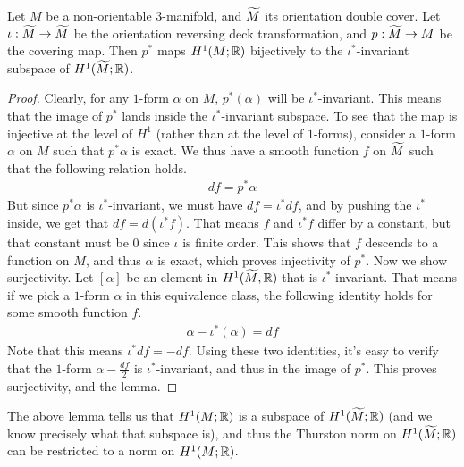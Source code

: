 \begin{lem}
  \label{lem:injective}
  Let $M$ be a non-orientable $3$-manifold, and $\widetilde{M}$ its orientation double cover. Let
  $\iota: \widetilde{M} \to \widetilde{M}$ be the orientation reversing deck transformation, and
  $p: \widetilde{M} \to M$ be the covering map. Then $p^{\ast}$ maps $H^1(M; \mathbb{R})$ bijectively to the
  $\iota^{\ast}$-invariant subspace of $H^1(\widetilde{M}; \mathbb{R})$.
\end{lem}
\begin{proof}
  Clearly, for any $1$-form $\alpha$ on $M$, $p^{\ast}(\alpha)$ will be
  $\iota^{\ast}$-invariant. This means that the image of $p^{\ast}$ lands inside the
  $\iota^{\ast}$-invariant subspace. To see that the map is injective at the level of $H^1$ (rather
  than at the level of $1$-forms), consider a $1$-form $\alpha$ on $M$ such that $p^{\ast}\alpha$
  is exact. We thus have a smooth function $f$ on $\widetilde{M}$ such that the following relation holds.
    \begin{align*}
        df = p^{\ast} \alpha
    \end{align*}
    But since $p^{\ast}\alpha$ is $\iota^{\ast}$-invariant, we must have $df = \iota^{\ast} df$,
    and by pushing the $\iota^{\ast}$ inside, we get that $df = d(\iota^{\ast}f)$. That means $f$
    and $\iota^{\ast}f$ differ by a constant, but that constant must be $0$ since $\iota$ is finite
    order. This shows that $f$ descends to a function on $M$, and thus $\alpha$ is exact, which
    proves injectivity of $p^{\ast}$. Now we show surjectivity. Let $[\alpha]$ be an element in
    $H^1(\widetilde{M}, \mathbb{R})$ that is $\iota^{\ast}$-invariant. That means if we pick a $1$-form $\alpha$
    in this equivalence class, the following identity holds for some smooth function $f$.
    \begin{align*}
        \alpha - \iota^{\ast}(\alpha) = df
    \end{align*}
    Note that this means $\iota^{\ast}df = -df$. Using these two identities, it's easy to verify
    that the $1$-form $\alpha - \frac{df}{2}$ is $\iota^{\ast}$-invariant, and thus in the image of
    $p^{\ast}$. This proves surjectivity, and the lemma.
\end{proof}

The above lemma tells us that $H^1(M; \mathbb{R})$ is a subspace of $H^1(\widetilde{M}; \mathbb{R})$ (and we know
precisely what that subspace is), and thus the Thurston norm on $H^1(\widetilde{M}; \mathbb{R})$ can be
restricted to a norm on $H^1(M; \mathbb{R})$.

